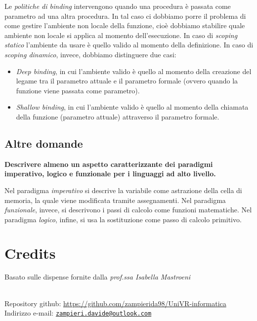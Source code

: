 \documentclass[a4paper,oneside,titlepage]{book}
\newcommand{\mail}[1]{\href{mailto:#1}{\texttt{#1}}}
\begin{document}
Le \emph{politiche di binding} intervengono quando una procedura è passata come parametro ad una altra procedura. In tal caso ci dobbiamo porre il problema di come gestire l'ambiente non locale della funzione, cioè dobbiamo stabilire quale ambiente non locale si applica al momento dell'esecuzione. In caso di \emph{scoping statico} l'ambiente da usare è quello valido al momento della definizione. In caso di \emph{scoping dinamico}, invece, dobbiamo distinguere due casi:
\begin{itemize}
	\item \emph{Deep binding}, in cui l'ambiente valido è quello al momento della creazione del legame tra il parametro attuale e il parametro formale (ovvero quando la funzione viene passata come parametro).
	\item \emph{Shallow binding}, in cui l'ambiente valido è quello al momento della chiamata della funzione (parametro attuale) attraverso il parametro formale.
\end{itemize}

\section{Altre domande}
\textbf{Descrivere almeno un aspetto caratterizzante dei paradigmi imperativo, logico e funzionale per i linguaggi ad alto livello.}

Nel paradigma \emph{imperativo} si descrive la variabile come astrazione della cella di memoria, la quale viene modificata tramite assegnamenti. Nel paradigma \emph{funzionale}, invece, si descrivono i passi di calcolo come funzioni matematiche. Nel paradigma \emph{logico}, infine, si usa la sostituzione come passo di calcolo primitivo.


\backmatter

\chapter{Credits}
Basato sulle dispense fornite dalla \textit{prof.ssa Isabella Mastroeni}

\noindent
\\
Repository github: \url{https://github.com/zampierida98/UniVR-informatica} \\
Indirizzo e-mail: \mail{zampieri.davide@outlook.com}
\end{document}
